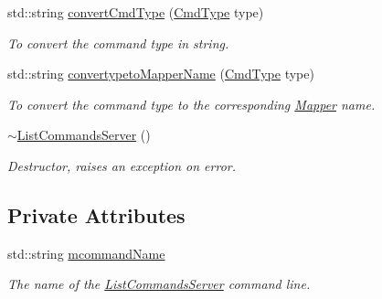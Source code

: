 \begin{DoxyCompactItemize}
std::string \hyperlink{classListCommandsServer_af253d25c235222b5872c31e590869a7a}{convertCmdType} (\hyperlink{namespacevishnu_a89462b396eca68c9c1a94a06d2f39532}{CmdType} type)
\begin{DoxyCompactList}\small\item\em To convert the command type in string. \item\end{DoxyCompactList}\item 
std::string \hyperlink{classListCommandsServer_a6ce3767fe37e769c0e3402ed0574dbb8}{convertypetoMapperName} (\hyperlink{namespacevishnu_a89462b396eca68c9c1a94a06d2f39532}{CmdType} type)
\begin{DoxyCompactList}\small\item\em To convert the command type to the corresponding \hyperlink{classMapper}{Mapper} name. \item\end{DoxyCompactList}\item 
\hypertarget{classListCommandsServer_afad26228bcf19880e8280e2bf5a54cad}{
\hyperlink{classListCommandsServer_afad26228bcf19880e8280e2bf5a54cad}{$\sim$ListCommandsServer} ()}
\label{classListCommandsServer_afad26228bcf19880e8280e2bf5a54cad}

\begin{DoxyCompactList}\small\item\em Destructor, raises an exception on error. \item\end{DoxyCompactList}\end{DoxyCompactItemize}
\subsection*{Private Attributes}
\begin{DoxyCompactItemize}
\item 
\hypertarget{classListCommandsServer_a4587e9f6bf59c8fe3bc0b9635e8880fd}{
std::string \hyperlink{classListCommandsServer_a4587e9f6bf59c8fe3bc0b9635e8880fd}{mcommandName}}
\label{classListCommandsServer_a4587e9f6bf59c8fe3bc0b9635e8880fd}

\begin{DoxyCompactList}\small\item\em The name of the \hyperlink{classListCommandsServer}{ListCommandsServer} command line. \item\end{DoxyCompactList}\end{DoxyCompactItemize}


